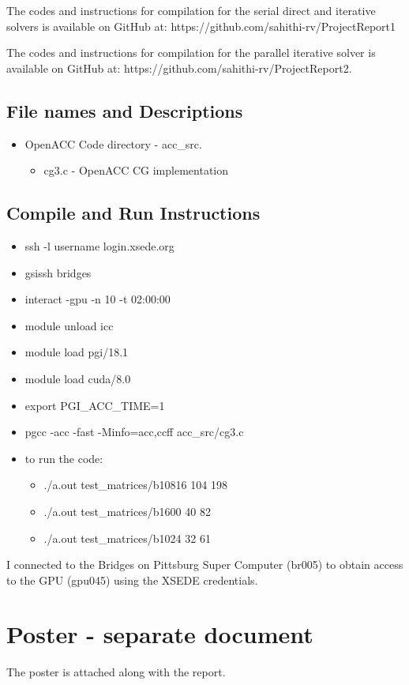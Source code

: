 \documentclass{article}
\begin{document}
\begin{spacing}{1.1}
\begin{appendices}
The codes and instructions for compilation for the serial direct and iterative solvers is available on GitHub at: https://github.com/sahithi-rv/ProjectReport1

The codes and instructions for compilation for the parallel iterative solver is available on GitHub at: https://github.com/sahithi-rv/ProjectReport2.

\subsection{File names and Descriptions}

\begin{itemize}
\item OpenACC Code directory - acc\_src.
\begin{itemize}
    \item cg3.c - OpenACC CG implementation
\end{itemize}
\end{itemize}

\subsection{Compile and Run Instructions}

\begin{itemize}
    \item ssh -l  username login.xsede.org
    \item gsissh bridges
    \item interact -gpu -n 10 -t 02:00:00
    \item module unload icc
    \item module load pgi/18.1
    \item module load cuda/8.0
    \item export PGI\_ACC\_TIME=1
    \item pgcc -acc -fast -Minfo=acc,ccff acc\_src/cg3.c
    \item to run the code:
    \begin{itemize}
        \item ./a.out test\_matrices/b10816 104 198
        \item ./a.out test\_matrices/b1600 40 82
        \item ./a.out test\_matrices/b1024 32 61
    \end{itemize}
\end{itemize}

I connected to the Bridges on Pittsburg Super Computer (br005) to obtain access to the GPU (gpu045) using the XSEDE credentials. 

\section{Poster - separate document}
The poster is attached along with the report.

\end{appendices}





\end{spacing}
\end{document}

